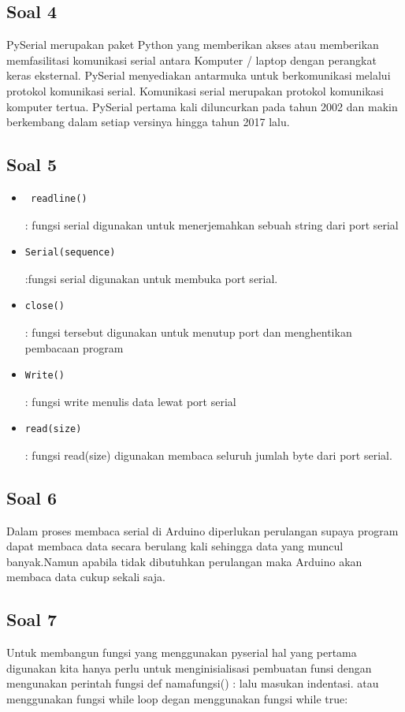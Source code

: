 	\subsection{Soal 4}
PySerial merupakan paket Python yang memberikan akses atau memberikan memfasilitasi komunikasi serial antara Komputer / laptop dengan perangkat keras eksternal. PySerial menyediakan antarmuka untuk berkomunikasi melalui protokol komunikasi serial. Komunikasi serial merupakan protokol komunikasi komputer tertua. PySerial pertama kali diluncurkan pada tahun 2002 dan makin berkembang dalam setiap versinya hingga tahun 2017 lalu.

	\subsection{Soal 5}
		\begin{itemize}
			\item \begin{verbatim} readline()\end{verbatim} : fungsi serial digunakan untuk menerjemahkan sebuah string dari port serial
			\item \begin{verbatim}Serial(sequence)\end{verbatim} :fungsi serial digunakan untuk membuka port serial.
			\item \begin{verbatim}close()\end{verbatim} : fungsi tersebut digunakan untuk menutup port  dan menghentikan pembacaan program
			\item \begin{verbatim}Write()\end{verbatim} : fungsi write menulis data lewat port serial 
			\item \begin{verbatim}read(size)\end{verbatim}	: fungsi read(size) digunakan membaca seluruh jumlah byte dari port serial.
		\end{itemize}

	\subsection{Soal 6}
	Dalam proses membaca serial di Arduino diperlukan perulangan supaya program dapat membaca data secara berulang kali sehingga data yang muncul banyak.Namun apabila tidak dibutuhkan perulangan maka Arduino akan membaca data cukup sekali saja.

	\subsection{Soal 7}
	Untuk membangun fungsi yang menggunakan pyserial hal yang pertama digunakan kita hanya perlu untuk menginisialisasi pembuatan funsi dengan mengunakan perintah fungsi def namafungsi() : lalu masukan indentasi. atau menggunakan fungsi while loop degan menggunakan  fungsi while true:


